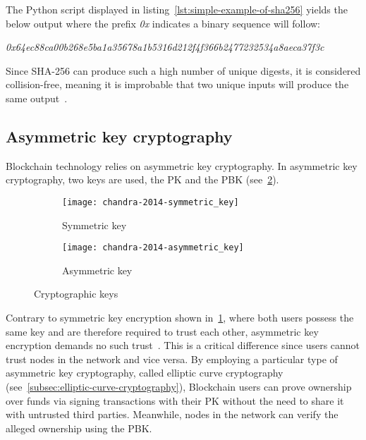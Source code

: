 The Python script displayed in listing~\ref{lst:simple-example-of-sha256} yields the below output where the prefix \emph{0x} indicates a binary sequence will follow:

\smallskip
\begingroup\small\emph{0x64ec88ca00b268e5ba1a35678a1b5316d212f4f366b2477232534a8aeca37f3c}\endgroup
\smallskip

Since SHA-256 can produce such a high number of unique digests, it is considered collision-free, meaning it is improbable that two unique inputs will produce the same output~\autocite[8]{yaga_blockchain_2018}.

\subsection{Asymmetric key cryptography}\label{subsec:asymmetric-key-cryptography}

\Gls{Blockchain} technology relies on asymmetric key cryptography.
In asymmetric key cryptography, two keys are used, the \gls{PK} and the \gls{PBK} (see~\cref{fig:asymmetric-key}).

\begin{figure}[H]
    \begin{subfigure}[b]{\textwidth}
        \centering
        \texttt{[image: chandra-2014-symmetric\_key]}
        \caption{Symmetric key}
        \label{fig:symmetric-key}
    \end{subfigure}
    \begin{subfigure}[b]{\textwidth}
        \centering
        \texttt{[image: chandra-2014-asymmetric\_key]}
        \caption{Asymmetric key}
        \label{fig:asymmetric-key}
    \end{subfigure}
    \caption[Cryptographic keys]{Cryptographic keys~\autocite[84]{chandra_comparative_2014}}\label{fig:cryptographic-keys}
\end{figure}

Contrary to symmetric key encryption shown in~\cref{fig:symmetric-key}, where both users possess the same key and are therefore required to trust each other, asymmetric key encryption demands no such trust~\autocites[84]{chandra_comparative_2014}[11]{yaga_blockchain_2018}.
This is a critical difference since users cannot trust nodes in the network and vice versa.
By employing a particular type of asymmetric key cryptography, called elliptic curve cryptography (see~\cref{subsec:elliptic-curve-cryptography}), \gls{Blockchain} users can prove ownership over funds via signing transactions with their \gls{PK} without the need to share it with untrusted third parties.
Meanwhile, nodes in the network can verify the alleged ownership using the \gls{PBK}.

